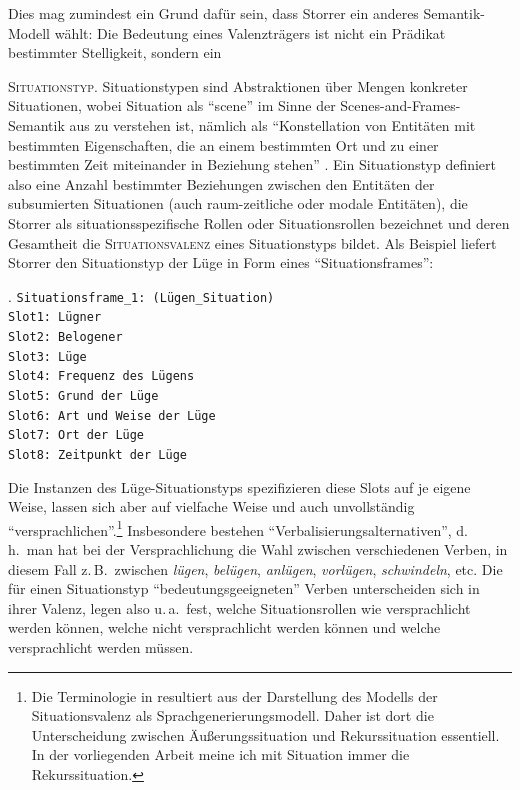 Dies mag zumindest ein Grund dafür sein, dass Storrer ein anderes Semantik-Modell wählt: Die Bedeutung eines Valenzträgers ist nicht ein Prädikat bestimmter Stelligkeit, sondern ein {\textsc{Situationstyp}. Situationstypen sind Abstraktionen über Mengen konkreter Situationen, wobei Situation als "`scene"' im Sinne der Scenes-and-Frames-Semantik aus \cite{Fillmore:77,Fillmore:77b} zu verstehen ist, nämlich als "`Konstellation von Entitäten mit bestimmten Eigenschaften, die an einem bestimmten Ort und zu einer bestimmten Zeit miteinander in Beziehung stehen"' \citep[232]{Storrer:96}. Ein Situationstyp definiert also eine Anzahl bestimmter Beziehungen zwischen den Entitäten der subsumierten Situationen (auch raum-zeitliche oder modale Entitäten), die Storrer als situationsspezifische Rollen oder Situationsrollen bezeichnet und deren Gesamtheit die \textsc{Situationsvalenz} eines Situationstyps bildet. Als Beispiel liefert Storrer den Situationstyp der Lüge in Form eines "`Situationsframes"':
\largerpage%

\ex. \label{ex-storrer-lüge} {\tt Situationsframe\_1: (Lügen\_Situation) \\[1.5ex] 
Slot1: Lügner \\
Slot2: Belogener \\
Slot3: Lüge \\
Slot4: Frequenz des Lügens \\
Slot5: Grund der Lüge \\
Slot6: Art und Weise der Lüge \\
Slot7: Ort der Lüge \\
Slot8: Zeitpunkt der Lüge \\[1.5ex]
}
\citep[286]{Storrer:92}

Die Instanzen des Lüge-Situationstyps spezifizieren diese Slots auf je eigene Weise, lassen sich aber auf vielfache Weise und auch unvollständig "`versprachlichen"'.\footnote{Die Terminologie in \cite{Storrer:92,Storrer:96} resultiert aus der Darstellung des Modells der Situationsvalenz als Sprachgenerierungsmodell. Daher ist dort die Unterscheidung zwischen Äu\ss erungssituation und Rekurssituation essentiell. In der vorliegenden Arbeit meine ich mit Situation immer die Rekurssituation.} Insbesondere bestehen "`Verbalisierungsalternativen"', d.\,h.\ man hat bei der Versprachlichung die Wahl zwischen verschiedenen Verben, in diesem Fall z.\,B.\ zwischen {\it lügen}, {\it belügen}, {\it anlügen}, {\it vorlügen}, {\it schwindeln}, etc. Die für einen Situationstyp "`bedeutungsgeeigneten"' Verben unterscheiden sich in ihrer Valenz, legen also u.\,a.\ fest, welche Situationsrollen wie versprachlicht werden können, welche nicht versprachlicht werden können und welche versprachlicht werden müssen. 

}
